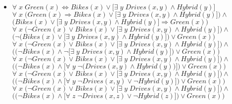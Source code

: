 \begin{enumerate}
\begin{itemize}
\item
$ \forall \; x \; \textit{Green}(x) \Leftrightarrow \textit{Bikes}(x) \lor \big[ \exists \; y \; \textit{Drives}(x, y) \land \textit{Hybrid}(y) \big]$\\[1ex]
$\forall \; x \; \big(\textit{Green}(x) \Rightarrow \textit{Bikes}(x) \lor \big[ \exists \; y \; \textit{Drives}(x, y) \land \textit{Hybrid}(y) \big] \big) \land$\\
$\big(\textit{Bikes}(x) \lor \big[ \exists \; y \; \textit{Drives}(x, y) \land \textit{Hybrid}(y) \big] \Rightarrow \textit{Green}(x) \big)$\\[1ex]
$\forall \; x \; \big(\neg \textit{Green}(x) \lor \textit{Bikes}(x) \lor \big[ \exists \; y \; \textit{Drives}(x, y) \land \textit{Hybrid}(y) \big] \big) \land$\\
$\big(\neg \big( \textit{Bikes}(x) \lor \big[ \exists \; y \; \textit{Drives}(x, y) \land \textit{Hybrid}(y) \big] \big) \lor \textit{Green}(x) \big)$\\[1ex]
$\forall \; x \; \big(\neg \textit{Green}(x) \lor \textit{Bikes}(x) \lor \big[ \exists \; y \; \textit{Drives}(x, y) \land \textit{Hybrid}(y) \big] \big) \land $\\
$\big(\big( \neg \textit{Bikes}(x) \land  \neg \big[ \exists \; y \; \textit{Drives}(x, y) \land \textit{Hybrid}(y) \big] \big) \lor \textit{Green}(x) \big)$\\[1ex]
$\forall \; x \; \big(\neg \textit{Green}(x) \lor \textit{Bikes}(x) \lor \big[ \exists \; y \; \textit{Drives}(x, y) \land \textit{Hybrid}(y) \big] \big) \land$\\
$\big(\big( \neg \textit{Bikes}(x) \land  \big[ \forall \; y \; \neg \big( \textit{Drives}(x, y) \land \textit{Hybrid}(y) \big) \big] \big) \lor \textit{Green}(x) \big)$\\[1ex]
$\forall \; x \; \big(\neg \textit{Green}(x) \lor \textit{Bikes}(x) \lor \big[ \exists \; y \; \textit{Drives}(x, y) \land \textit{Hybrid}(y) \big] \big) \land$\\
$\big(\big( \neg \textit{Bikes}(x) \land  \big[ \forall \; y \; \neg \textit{Drives}(x, y) \lor \neg \textit{Hybrid}(y) \big] \big) \lor \textit{Green}(x) \big)$\\[1ex]
$\forall \; x \; \big(\neg \textit{Green}(x) \lor \textit{Bikes}(x) \lor \big[ \exists \; y \; \textit{Drives}(x, y) \land \textit{Hybrid}(y) \big] \big) \land$\\
$\big(\big( \neg \textit{Bikes}(x) \land  \big[ \forall \; z \; \neg \textit{Drives}(x, z) \lor \neg \textit{Hybrid}(z) \big] \big) \lor \textit{Green}(x) \big)$\\[1ex]

\end{itemize}
\end{enumerate}
